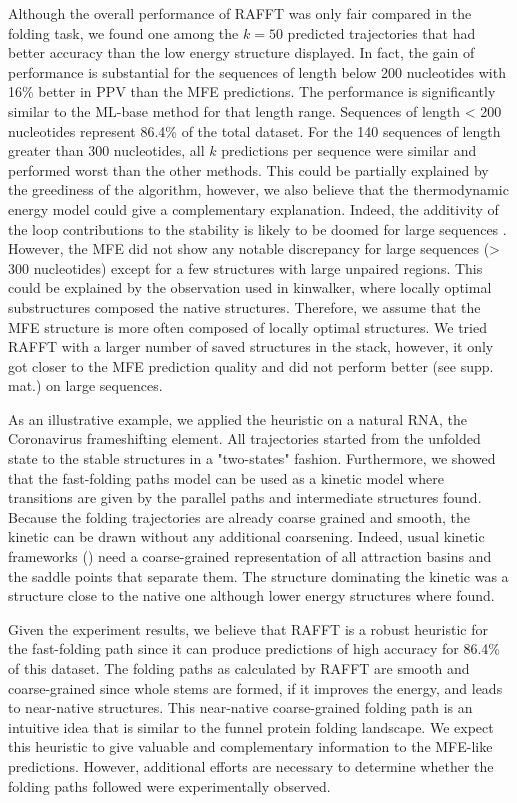 \documentclass[a4paper,12pt]{article}
\begin{document}
{{Although the overall performance of RAFFT was only fair compared in the folding
task, we found one among the \(k=50\) predicted trajectories that had better
accuracy than the low energy structure displayed. In fact, the gain of
performance is substantial for the sequences of length below 200 nucleotides
with 16\% better in PPV than the MFE predictions. The performance is
significantly similar to the ML-base method for that length range. Sequences of
length \textless{} 200 nucleotides represent 86.4\% of the total dataset. For the 140
sequences of length greater than 300 nucleotides, all \(k\) predictions per
sequence were similar and performed worst than the other methods. This could be
partially explained by the greediness of the algorithm, however, we also believe
that the thermodynamic energy model could give a complementary explanation.
Indeed, the additivity of the loop contributions to the stability is likely to
be doomed for large sequences \cite{tinoco99_how_rna_folds}. However, the MFE did
not show any notable discrepancy for large sequences (\textgreater{} 300 nucleotides)
except for a few structures with large unpaired regions. This could be explained
by the observation used in kinwalker, where locally optimal substructures
composed the native structures. Therefore, we assume that the MFE structure is
more often composed of locally optimal structures. We tried RAFFT with a larger
number of saved structures in the stack, however, it only got closer to the MFE
prediction quality and did not perform better (see supp. mat.) on large
sequences.

As an illustrative example, we applied the heuristic on a natural RNA, the
Coronavirus frameshifting element. All trajectories started from the unfolded
state to the stable structures in a "two-states" fashion. Furthermore, we showed
that the fast-folding paths model can be used as a kinetic model where
transitions are given by the parallel paths and intermediate structures found.
Because the folding trajectories are already coarse grained and smooth, the
kinetic can be drawn without any additional coarsening. Indeed, usual kinetic
frameworks (\cite{lorenz20_effic_comput_base_probab_multi_rna_foldin}) need a
coarse-grained representation of all attraction basins and the saddle points
that separate them. The structure dominating the kinetic was a structure close
to the native one although lower energy structures where found.

Given the experiment results, we believe that RAFFT is a robust heuristic for
the fast-folding path since it can produce predictions of high accuracy for
86.4\% of this dataset. The folding paths as calculated by RAFFT are smooth and
coarse-grained since whole stems are formed, if it improves the energy, and
leads to near-native structures. This near-native coarse-grained folding path is
an intuitive idea that is similar to the funnel protein folding landscape. We
expect this heuristic to give valuable and complementary information to the
MFE-like predictions. However, additional efforts are necessary to determine
whether the folding paths followed were experimentally observed.

}}
\end{document}
